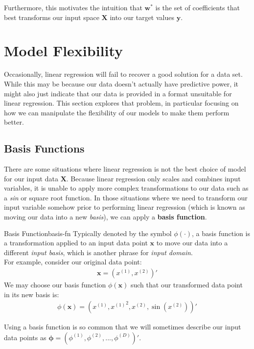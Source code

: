 Furthermore, this motivates the intuition that $\textbf{w}^{*}$ is the set of coefficients that best transforms our input space $\textbf{X}$ into our target values $\textbf{y}$.

\section{Model Flexibility}
Occasionally, linear regression will fail to recover a good solution for a data set. While this may be because our data doesn't actually have predictive power, it might also just indicate that our data is provided in a format unsuitable for linear regression. This section explores that problem, in particular focusing on how we can manipulate the flexibility of our models to make them perform better.

\subsection{Basis Functions}
There are some situations where linear regression is not the best choice of model for our input data $\textbf{X}$. Because linear regression only scales and combines input variables, it is unable to apply more complex transformations to our data such as a \textit{sin} or square root function. In those situations where we need to transform our input variable somehow prior to performing linear regression (which is known as moving our data into a new \textit{basis}), we can apply a \textbf{basis function}.

\begin{definition}{Basis Function}{basis-fn}
    Typically denoted by the symbol $\phi(\cdot)$, a basis function is a transformation applied to an input data point $\textbf{x}$ to move our data into a different \textit{input basis}, which is another phrase for \textit{input domain}. \\

    For example, consider our original data point:
    \begin{align*}
    \textbf{x} = (x^{(1)}, x^{(2)})'
    \end{align*}
    We may choose our basis function $\phi(\textbf{x})$ such that our transformed data point in its new basis is:
    \begin{align*}
        \phi(\textbf{x}) = (x^{(1)}, {x^{(1)}}^2, x^{(2)}, \sin(x^{(2)}))'
    \end{align*}

    Using a basis function is so common that we will sometimes describe our input data points as $\boldsymbol{\phi} = (\phi^{(1)}, \phi^{(2)}, ..., \phi^{(D)})'$.
\end{definition}

